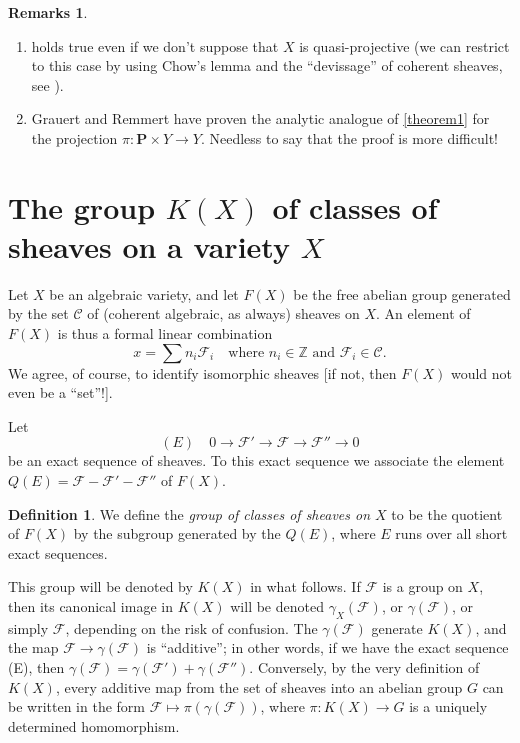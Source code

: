 \documentclass{article}
\theoremstyle{plain}
\theoremstyle{definition}
\newtheorem*{remarks}{Remarks}
\newtheorem*{definition}{Definition}
\newcommand{\sh}{\mathscr}
\newcommand{\cat}{\mathcal}
\newcommand{\PP}{\mathbf{P}}
\newcommand{\oldpage}[1]{\marginpar{\footnotesize$\Big\vert$ \textit{p.~#1}}}
\begin{document}
\begin{remarks}
  \begin{enumerate}
    \item {} holds true even if we don't suppose that $X$ is quasi-projective (we can restrict to this case by using Chow's lemma and the ``devissage'' of coherent sheaves, see \cite{6}).
    \item Grauert and Remmert have proven the analytic analogue of \cref{theorem1} for the projection $\pi\colon\PP\times Y\to Y$.
      Needless to say that the proof is more difficult!
  \end{enumerate}
\end{remarks}


\section{The group $K(X)$ of classes of sheaves on a variety $X$}
\label{section4}

\oldpage{105}
Let $X$ be an algebraic variety, and let $F(X)$ be the free abelian group generated by the set $\cat{C}$ of (coherent algebraic, as always) sheaves on $X$.
An element of $F(X)$ is thus a formal linear combination
\[
  x = \sum n_i\sh{F}_i
  \quad
  \mbox{where $n_i\in\mathbb{Z}$ and $\sh{F}_i\in\cat{C}$.}
\]
We agree, of course, to identify isomorphic sheaves [if not, then $F(X)$ would not even be a ``set''!].

Let
\[
  (E)\quad
  0\to\sh{F}'\to\sh{F}\to\sh{F''}\to0
\]
be an exact sequence of sheaves.
To this exact sequence we associate the element $Q(E)=\sh{F}-\sh{F}'-\sh{F}''$ of $F(X)$.

\begin{definition}
  We define the \emph{group of classes of sheaves on $X$} to be the quotient of $F(X)$ by the subgroup generated by the $Q(E)$, where $E$ runs over all short exact sequences.
\end{definition}

This group will be denoted by $K(X)$ in what follows.
If $\sh{F}$ is a group on $X$, then its canonical image in $K(X)$ will be denoted $\gamma_X(\sh{F})$, or $\gamma(\sh{F})$, or simply $\sh{F}$, depending on the risk of confusion.
The $\gamma(\sh{F})$ generate $K(X)$, and the map $\sh{F}\to\gamma(\sh{F})$ is ``additive'';
in other words, if we have the exact sequence (E), then $\gamma(\sh{F})=\gamma(\sh{F}')+\gamma(\sh{F}'')$.
Conversely, by the very definition of $K(X)$, every additive map from the set of sheaves into an abelian group $G$ can be written in the form $\sh{F}\mapsto\pi(\gamma(\sh{F}))$, where $\pi\colon K(X)\to G$ is a uniquely determined homomorphism.
\end{document}
